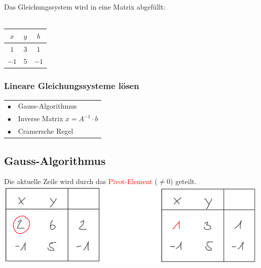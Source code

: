 			Das Gleichungssystem wird in eine Matrix abgefüllt: \\
			\\
			 \begin{tabular}[h]{|c c | c|}
			 \hline
			 $x$ & $y$ & $b$\\
			 \hline
			 $1$ & $3$ & $1$ \\
			 $-1$ & $5$ & $-1$ \\
			 \hline
			 \end{tabular}
			 
			 
			 \subsubsection{Lineare Gleichungssysteme lösen}
			 \begin{tabular}{ll}
			 $\bullet$ & Gauss-Algorithmus \\
			 $\bullet$ & Inverse Matrix $x = A^{-1} \cdot b$ \\
			 $\bullet$ & Cramersche Regel \\
			 \end{tabular}
			 
			 
		    \subsection{Gauss-Algorithmus}
		    Die aktuelle Zeile wird durch das \textcolor{red}{Pivot-Element} ($\neq 0$) geteilt. \\  
		     \includegraphics[width=0.45\linewidth]{Bilder/gauss1} \\
		   	

